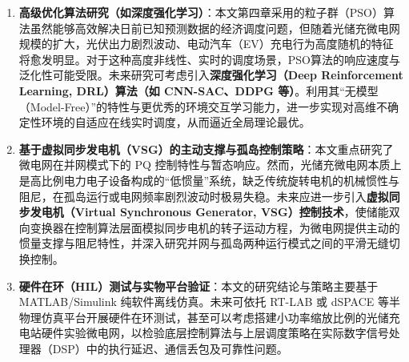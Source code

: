 \begin{enumerate}
    \item \textbf{高级优化算法研究（如深度强化学习）}：本文第四章采用的粒子群（PSO）算法虽然能够高效解决日前已知预测数据的经济调度问题，但随着光储充微电网规模的扩大，光伏出力剧烈波动、电动汽车（EV）充电行为高度随机的特征将愈发明显。对于这种高度非线性、实时的调度场景，PSO算法的响应速度与泛化性可能受限。未来研究可考虑引入\textbf{深度强化学习（Deep Reinforcement Learning, DRL）算法（如 CNN-SAC、DDPG 等）}。利用其“无模型（Model-Free）”的特性与更优秀的环境交互学习能力，进一步实现对高维不确定性环境的自适应在线实时调度，从而逼近全局理论最优。
    \item \textbf{基于虚拟同步发电机（VSG）的主动支撑与孤岛控制策略}：本文重点研究了微电网在并网模式下的 PQ 控制特性与暂态响应。然而，光储充微电网本质上是高比例电力电子设备构成的“低惯量”系统，缺乏传统旋转电机的机械惯性与阻尼，在孤岛运行或电网频率剧烈波动时极易失稳。未来应进一步引入\textbf{虚拟同步发电机（Virtual Synchronous Generator, VSG）控制技术}，使储能双向变换器在控制算法层面模拟同步电机的转子运动方程，为微电网提供主动的惯量支撑与阻尼特性，并深入研究并网与孤岛两种运行模式之间的平滑无缝切换控制。
    \item \textbf{硬件在环（HIL）测试与实物平台验证}：本文的研究结论与策略主要基于 MATLAB/Simulink 纯软件离线仿真。未来可依托 RT-LAB 或 dSPACE 等半物理仿真平台开展硬件在环测试，甚至可以考虑搭建小功率缩放比例的光储充电站硬件实验微电网，以检验底层控制算法与上层调度策略在实际数字信号处理器（DSP）中的执行延迟、通信丢包及可靠性问题。
\end{enumerate}